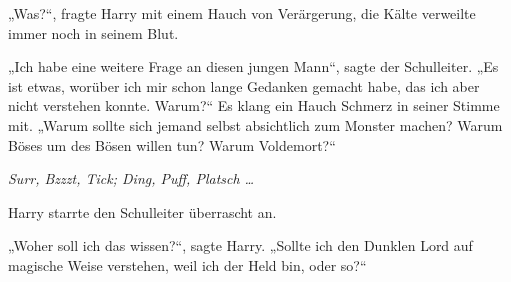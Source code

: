 „Was?“, fragte Harry mit einem Hauch von Verärgerung, die Kälte verweilte immer noch in seinem Blut.

„Ich habe eine weitere Frage an diesen jungen Mann“, sagte der Schulleiter.
„Es ist etwas, worüber ich mir schon lange Gedanken gemacht habe, das ich aber nicht verstehen konnte. Warum?“ Es klang ein Hauch Schmerz in seiner Stimme mit.
„Warum sollte sich jemand selbst absichtlich zum Monster machen? Warum Böses um des Bösen willen tun? Warum Voldemort?“

\later

\emph{Surr, Bzzzt, Tick; Ding, Puff, Platsch …}

Harry starrte den Schulleiter überrascht an.

„Woher soll ich das wissen?“, sagte Harry.
„Sollte ich den Dunklen Lord auf magische Weise verstehen, weil ich der Held bin, oder so?“


